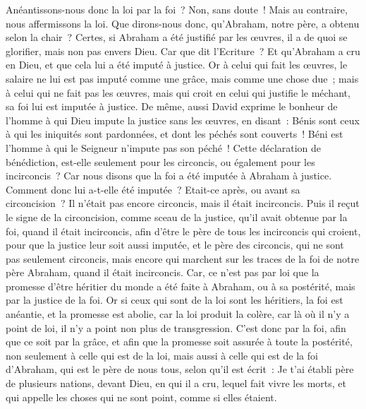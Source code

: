 \begin{multicols}{2}
Anéantissons-nous donc la loi par la foi~? Non, sans doute~! Mais au contraire, nous affermissons la loi.
\VerseOne{}Que dirons-nous donc, qu'Abraham, notre père, a obtenu selon la chair~?
Certes, si Abraham a été justifié par les œuvres, il a de quoi se glorifier, mais non pas envers Dieu.
Car que dit l'Ecriture~? Et qu'Abraham a cru en Dieu, et que cela lui a été imputé à justice.
Or à celui qui fait les œuvres, le salaire ne lui est pas imputé comme une grâce, mais comme une chose due~;
mais à celui qui ne fait pas les œuvres, mais qui croit en celui qui justifie le méchant, sa foi lui est imputée à justice.
De même, aussi David exprime le bonheur de l'homme à qui Dieu impute la justice sans les œuvres, en disant~:
Bénis sont ceux à qui les iniquités sont pardonnées, et dont les péchés sont couverts~!
Béni est l'homme à qui le Seigneur n'impute pas son péché~!
Cette déclaration de bénédiction, est-elle seulement pour les circoncis, ou également pour les incirconcis~? Car nous disons que la foi a été imputée à Abraham à justice.
Comment donc lui a-t-elle été imputée~? Etait-ce après, ou avant sa circoncision~? Il n'était pas encore circoncis, mais il était incirconcis.
Puis il reçut le signe de la circoncision, comme sceau de la justice, qu'il avait obtenue par la foi, quand il était incirconcis, afin d'être le père de tous les incirconcis qui croient, pour que la justice leur soit aussi imputée,
et le père des circoncis, qui ne sont pas seulement circoncis, mais encore qui marchent sur les traces de la foi de notre père Abraham, quand il était incirconcis.
Car, ce n'est pas par loi que la promesse d'être héritier du monde a été faite à Abraham, ou à sa postérité, mais par la justice de la foi.
Or si ceux qui sont de la loi sont les héritiers, la foi est anéantie, et la promesse est abolie,
car la loi produit la colère, car là où il n'y a point de loi, il n'y a point non plus de transgression.
C'est donc par la foi, afin que ce soit par la grâce, et afin que la promesse soit assurée à toute la postérité, non seulement à celle qui est de la loi, mais aussi à celle qui est de la foi d'Abraham, qui est le père de nous tous,
selon qu'il est écrit~: Je t'ai établi père de plusieurs nations, devant Dieu, en qui il a cru, lequel fait vivre les morts, et qui appelle les choses qui ne sont point, comme si elles étaient.

\end{multicols}
